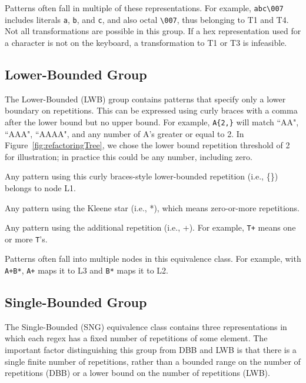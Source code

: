 Patterns often fall in multiple of these representations. For example, \verb!abc\007! includes literals \verb!a!, \verb!b!, and \verb!c!, and also octal \verb!\007!, thus belonging to T1 and T4.
Not all transformations are possible in this group. If a hex representation used for a character is not on the keyboard, a transformation to T1 or T3 is infeasible.

\subsection{Lower-Bounded Group}
The Lower-Bounded (LWB) group contains patterns that specify only a lower boundary on repetitions. This can be expressed using curly braces with a comma after the lower bound but no upper bound. For example, \verb!A{2,}! will match ``AA", ``AAA", ``AAAA", and any number of A's greater or equal to 2. In Figure~\ref{fig:refactoringTree}, we chose the lower bound repetition threshold of 2 for illustration; in practice this could be any number, including zero.


\begin{description} \itemsep -1pt
\item[L1:] Any pattern using this curly braces-style lower-bounded repetition (i.e., \{\}) belongs to node L1.
\item[L2:] Any pattern using the Kleene star (i.e., *), which means zero-or-more repetitions. %
\item[L3:] Any pattern using the additional repetition (i.e., +). For example, \verb!T+! means one or more \verb!T!'s.
\end{description}

Patterns often fall into multiple nodes in this equivalence class. For example, with \verb!A+B*!, \verb!A+! maps it to L3 and \verb!B*! maps it to L2.

\subsection{Single-Bounded Group}
The Single-Bounded (SNG) equivalence class contains three representations in which each regex has a fixed number of repetitions of some element. The important factor distinguishing this group from DBB and LWB is that there is a single finite number of repetitions, rather than a bounded range on the number of repetitions (DBB) or a lower bound on the number of repetitions (LWB).


